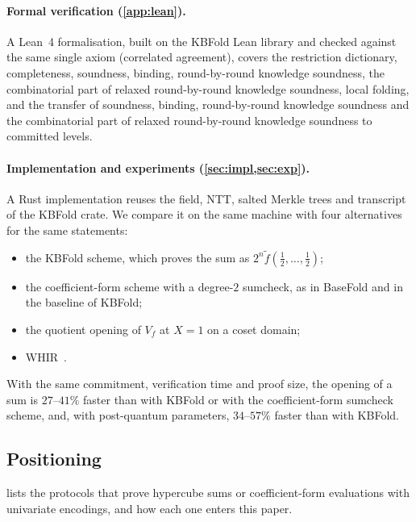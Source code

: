 \paragraph{Formal verification (\cref{app:lean}).}
A Lean~4 formalisation, built on the KBFold Lean library and checked against the same single axiom (correlated agreement), covers the restriction dictionary, completeness, soundness, binding, round-by-round knowledge soundness, the combinatorial part of relaxed round-by-round knowledge soundness, local folding, and the transfer of soundness, binding, round-by-round knowledge soundness and the combinatorial part of relaxed round-by-round knowledge soundness to committed levels.

\paragraph{Implementation and experiments (\cref{sec:impl,sec:exp}).}
A Rust implementation reuses the field, NTT, salted Merkle trees and transcript of the KBFold crate.
We compare it on the same machine with four alternatives for the same statements:
\begin{itemize}
  \item the KBFold scheme, which proves the sum as $2^n \tilde f(\tfrac12,\dots,\tfrac12)$;
  \item the coefficient-form scheme with a degree-$2$ sumcheck, as in BaseFold and in the baseline of KBFold;
  \item the quotient opening of $V_f$ at $X = 1$ on a coset domain;
  \item WHIR~\cite{ACFY24}.
\end{itemize}
With the same commitment, verification time and proof size, the opening of a sum is $27$--$41\%$ faster than with KBFold or with the coefficient-form sumcheck scheme, and, with post-quantum parameters, $34$--$57\%$ faster than with KBFold.

\subsection{Positioning}\label{sec:intro:position}

 lists the protocols that prove hypercube sums or coefficient-form evaluations with univariate encodings, and how each one enters this paper.

